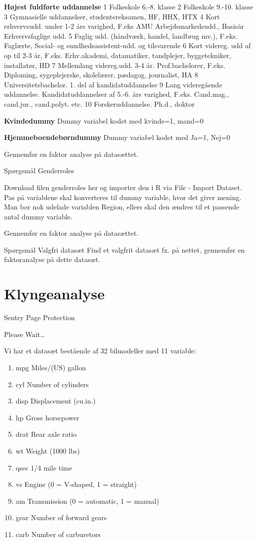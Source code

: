 \documentclass[]{book}
\providecommand{\tightlist}{%
  \setlength{\itemsep}{0pt}\setlength{\parskip}{0pt}}
\begin{document}
\textbf{Højest fuldførte uddannelse }
1 Folkeskole 6.-8. klasse
2 Folkeskole 9.-10. klasse
3 Gymnasielle uddannelser, studentereksamen, HF, HHX, HTX
4 Kort erhvervsudd. under 1-2 års varighed, F.eks AMU Arbejdsmarkedsudd., Basisår Erhvervsfaglige udd.
5 Faglig udd. (håndværk, handel, landbrug mv.), F.eks. Faglærte, Social- og sundhedsassistent-udd. og tilsvarende
6 Kort videreg. udd af op til 2-3 år, F.eks. Erhv.akademi, datamatiker, tandplejer, byggetekniker, installatør, HD
7 Mellemlang videreg.udd. 3-4 år. Prof.bachelorer, F.eks. Diploming, sygeplejerske, skolelærer, pædagog, journalist, HA
8 Universitetsbachelor. 1. del af kandidatuddannelse
9 Lang videregående uddannelse. Kandidatuddannelser af 5.-6. års varighed, F.eks. Cand.mag., cand.jur., cand.polyt. etc.
10 Forskeruddannelse. Ph.d., doktor

\textbf{Kvindedummy}
Dummy variabel kodet med kvinde=1, mand=0

\textbf{Hjemmeboendebørndummy}
Dummy variabel kodet med Ja=1, Nej=0

Gennemfør en faktor analyse på datasættet.

Spørgsmål Genderroles

Download filen genderroles her og importer den i R via File - Import Dataset.
Pas på variablene skal konverteres til dummy variable, hvor det giver mening. Man bør nok udelade variablen Region, ellers skal den ændres til et passende antal dummy variable.

Gennemfør en faktor analyse på datasættet.

Spørgsmål Valgfri datasæt
Find et valgfrit datasæt fx. på nettet, gennemfør en faktoranalyse på dette datasæt.

\hypertarget{klyngeanalyse}{%
\chapter{Klyngeanalyse}\label{klyngeanalyse}}

\hypertarget{Sentry_noJS}{}
Sentry Page Protection

\hypertarget{Sentry_redirecting}{}
Please Wait\ldots{}

Vi har et datasæt bestående af 32 bilmodeller med 11 variable:

\begin{enumerate}
\def\labelenumi{\arabic{enumi}.}
\tightlist
\item
  mpg Miles/(US) gallon
\item
  cyl Number of cylinders
\item
  disp Displacement (cu.in.)
\item
  hp Gross horsepower
\item
  drat Rear axle ratio
\item
  wt Weight (1000 lbs)
\item
  qsec 1/4 mile time
\item
  vs Engine (0 = V-shaped, 1 = straight)
\item
  am Transmission (0 = automatic, 1 = manual)
\item
  gear Number of forward gears
\item
  carb Number of carburetors
\end{enumerate}
\end{document}
